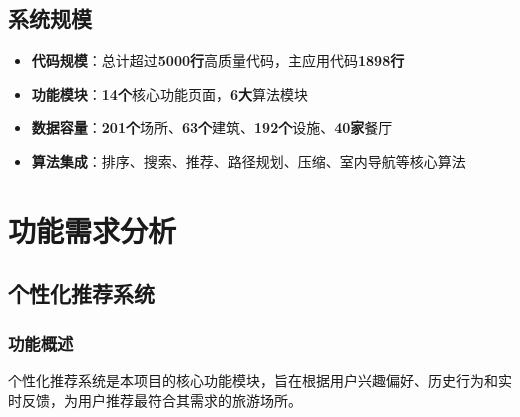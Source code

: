 \documentclass[12pt,a4paper]{article}
\begin{document}
\subsection{系统规模}

\begin{successbox}[title={系统数据规模统计}]
\begin{itemize}[nosep]
    \item \textbf{代码规模}：总计超过\textcolor{primary}{\textbf{5000行}}高质量代码，主应用代码\textcolor{secondary}{\textbf{1898行}}
    \item \textbf{功能模块}：\textcolor{success}{\textbf{14个}}核心功能页面，\textcolor{success}{\textbf{6大}}算法模块
    \item \textbf{数据容量}：\textcolor{warning}{\textbf{201个}}场所、\textcolor{warning}{\textbf{63个}}建筑、\textcolor{warning}{\textbf{192个}}设施、\textcolor{warning}{\textbf{40家}}餐厅
    \item \textbf{算法集成}：排序、搜索、推荐、路径规划、压缩、室内导航等核心算法
\end{itemize}
\end{successbox}

\section{功能需求分析}

\subsection{个性化推荐系统}

\subsubsection{功能概述}
个性化推荐系统是本项目的核心功能模块，旨在根据用户兴趣偏好、历史行为和实时反馈，为用户推荐最符合其需求的旅游场所。
\end{document}
